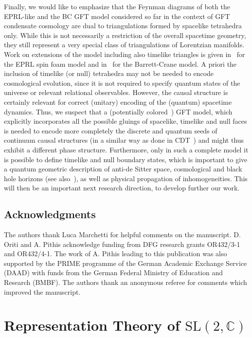 \documentclass[11pt,a4paper]{article}
\newcommand{\C}{\mathbb C}
\newcommand{\SL}{\text{SL$(2,\C)$}}
\begin{document}
Finally, we would like to emphasize that the Feynman diagrams of both the EPRL-like and the BC GFT model considered so far in the context of GFT condensate cosmology are dual to triangulations formed by spacelike tetrahedra only. While this is not necessarily a restriction of the overall spacetime geometry, they still represent a very special class of triangulations of Lorentzian manifolds. Work on extensions of the model including also timelike triangles is given in~\cite{Conrady:2010vx,Conrady:2010kc} for the EPRL spin foam model and in~\cite{Barrett:1999qw,Perez:2000ep} for the Barrett-Crane model. A priori the inclusion of timelike (or null) tetrahedra may not be needed to encode cosmological evolution, since it is not required to specify quantum states of the universe or relevant relational observables. However, the causal structure is certainly relevant for correct (unitary) encoding of the (quantum) spacetime dynamics. Thus, we suspect that a (potentially colored~\cite{Gurau:2011xp}) GFT model, which explicitly incorporates all the possible gluings of spacelike, timelike and null faces is needed to encode more completely the discrete and quantum seeds of continuum causal structures (in a similar way as done in CDT~\cite{Ambjorn:2001cv,Gorlich:2013hu,Ambjorn:2013tki,Loll:2019rdj}) and might thus exhibit a different phase structure. Furthermore, only in such a complete model it is possible to define timelike and null boundary states, which is important to give a quantum geometric description of anti-de Sitter space, cosmological and black hole horizons (see also~\cite{Speziale:2013ifa}), as well as physical propagation of inhomogeneities. This will then be an important next research direction, to develop further our work. 

\subsection*{Acknowledgments}

The authors thank Luca Marchetti for helpful comments on the manuscript. D. Oriti and A. Pithis acknowledge funding from DFG research grants OR432/3-1 and OR432/4-1.
The work of A. Pithis leading to this publication was also supported by the PRIME programme of the German Academic Exchange Service (DAAD) with funds from the German Federal Ministry of Education and Research (BMBF). The authors thank an anonymous referee for comments which improved the manuscript.

\appendix

\section{Representation Theory of $\SL$}\label{appendix:Representation Theory of SL2C}
\end{document}
